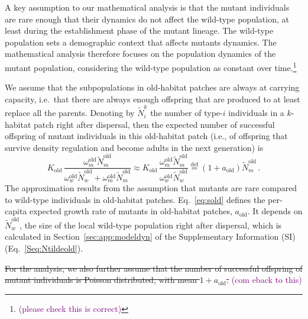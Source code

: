 \documentclass[11pt]{article}
\newcommand{\florence}[1]{\textcolor{purple}{(#1)}} %
\begin{document}
A key assumption to our mathematical analysis is that the mutant individuals are rare enough that their dynamics do not affect the wild-type population, at least during the establishment phase of the mutant lineage. The wild-type population sets a demographic context that affects mutants dynamics. The mathematical analysis therefore focuses on the population dynamics of the mutant population, considering the wild-type population as constant over time.\footnote{\florence{please check this is correct}}

We assume that the subpopulations in old-habitat patches are always at carrying capacity, i.e.\ that there are always enough offspring that are produced to at least replace all the parents. Denoting by $\widetilde{N}_{i}^{k}$ the number of type-$i$ individuals in a $k$-habitat patch right after dispersal, then the expected number of successful offspring of mutant individuals in this old-habitat patch (i.e., of offspring that survive density regulation and become adults in the next generation) is 
%
\begin{equation}\label{eq:sold}
K_{\text{old}}\, \frac{\omega^\text{old}_m \widetilde{N}^{\text{old}}_m}{\omega^\text{old}_w \widetilde{N}^{\text{old}}_w + \omega^\text{old}_m \widetilde{N}^{\text{old}}_m}
%
\approx K_{\text{old}}\, \frac{\omega^\text{old}_m \widetilde{N}^{\text{old}}_m}{\omega^\text{old}_w \widetilde{N}^{\text{old}}_w} 
%
\overset{\mathrm{def}}{=} \left(1 + a_{\text{old}}\right) \widetilde{N}^{\text{old}}_m \, .
\end{equation}
%
The approximation results from the assumption that mutants are rare compared to wild-type individuals in old-habitat patches. Eq.~\eqref{eq:sold} defines the per-capita expected growth rate of mutants in old-habitat patches, $a_{\text{old}}$. It depends on $\widetilde{N}^{\text{old}}_w$, the size of the local wild-type population right after dispersal, which is calculated in Section~\ref{sec:app:modeldyn} of the Supplementary Information (SI) (Eq.~\eqref{Seq:Ntildeold}).

\st{For the analysis, we also further assume that the number of successful offspring of mutant individuals is Poisson distributed, with mean $1+ a_{\text{old}}$. }\florence{com eback to this}

\end{document}
